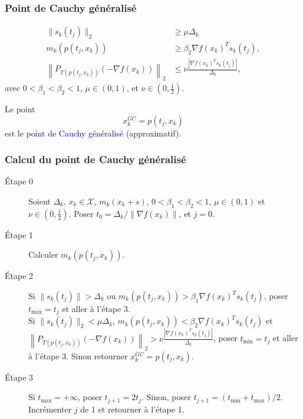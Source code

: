\documentclass[t,usepdftitle=false]{beamer}
\def\cX{\mathcal{X}}
\begin{document}
\begin{frame}
\frametitle{Point de Cauchy généralisé}

\begin{align*}
\| s_k(t_j) \|_2 & \geq \mu \Delta_k \\
m_k(p(t_j,x_k)) & \geq \beta_2 \nabla f(x_k)^T s_k(t_j), \\
\left\| P_{T(p(t_j,x_k))}(-\nabla f(x_k)) \right\|_2 &\leq \nu \frac{ \left| \nabla f(x_k)^Ts_k(t_j) \right| }{\Delta_k},
\end{align*}
avec $0 < \beta_1 < \beta_2 < 1$, $\mu \in (0,1)$, et $\nu \in (0, \frac{1}{2})$.

\mbox{}

Le point
$$
x_k^{GC} = p(t_j, x_k)
$$
est le \textcolor{blue}{point de Cauchy généralisé} (approximatif).

\end{frame}

\begin{frame}
\frametitle{Calcul du point de Cauchy généralisé}

\begin{description}
	\item[Étape 0] Soient $\Delta_k$, $x_k \in \cX$, $m_k(x_k+s)$, $0 < \beta_1 < \beta_2 < 1$, $\mu \in (0,1)$ et $\nu \in (0, \frac{1}{2})$.
	Poser $t_0 = \Delta_k/\|\nabla f(x_k)\|$, et $j = 0$.
	\item[Étape 1] Calculer $m_k(p(t_j,x_k))$.
	\item[Étape 2] Si $\| s_k(t_j) \| > \Delta_k$ ou
	$m_k(p(t_j,x_k)) > \beta_1 \nabla f(x_k)^T s_k(t_j)$, poser $t_{\max} = t_j$ et aller à l'étape 3.\\
	Si $\| s_k(t_j) \|_2 < \mu \Delta_k$, $m_k(p(t_j,x_k)) < \beta_2 \nabla f(x_k)^T s_k(t_j)$ et $\left\| P_{T(p(t_j,x_k))}(-\nabla f(x_k)) \right\|_2 > \nu \frac{ \left| \nabla f(x_k)^Ts_k(t_j) \right| }{\Delta_k}$, poser $t_{\min} = t_j$ et aller à l'étape 3.
	Sinon retourner $x_k^{GC} = p(t_j,x_k)$.
	\item[Étape 3] Si $t_{\max} = +\infty$, poser $t_{j+1} = 2t_j$.
	Sinon, poser $t_{j+1} = \left(t_{\min}+t_{\max}\right)/2$.
	Incrémenter $j$ de 1 et retourner à l'étape 1.
\end{description}

\end{frame}
\end{document}
